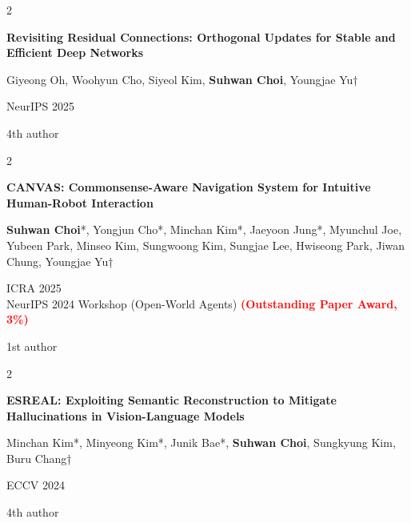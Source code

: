 \documentclass[10pt, letterpaper]{article}
\newenvironment{pubentry}[2][]{
    \onecolentry
    \def\secondColumn{#2}
    \setcolumnwidth{\fill, 2 cm}
    \begin{paracol}{2}
}{
    \switchcolumn \raggedleft \secondColumn
    \end{paracol}
    \endonecolentry
} %
\let\hrefWithoutArrow\href
\renewcommand{\href}[2]{\hrefWithoutArrow{#1}{\ifthenelse{\equal{#2}{}}{ }{#2 }\raisebox{.15ex}{\footnotesize \faExternalLink*}}}
\begin{document}
\vspace{0.2 cm}

\begin{samepage}
    \begin{pubentry}{
            4th author
        }
        \textbf{Revisiting Residual Connections: Orthogonal Updates for Stable and Efficient Deep Networks}

        \vspace{0.10 cm}

        \small Giyeong Oh, Woohyun Cho, Siyeol Kim, \textbf{Suhwan Choi}, Youngjae Yu†

        \vspace{0.10 cm}

        NeurIPS 2025
    \end{pubentry}
\end{samepage}

\vspace{0.2 cm}

\begin{samepage}
    \begin{pubentry}{
            1st author
        }
        \textbf{CANVAS: Commonsense-Aware Navigation System for Intuitive Human-Robot Interaction} \href{https://worv-ai.github.io/canvas/}{[Website]}

        \vspace{0.10 cm}

        \small \textbf{Suhwan Choi}*, Yongjun Cho*, Minchan Kim*, Jaeyoon Jung*, Myunchul Joe, Yubeen Park, Minseo Kim, Sungwoong Kim, Sungjae Lee, Hwiseong Park, Jiwan Chung, Youngjae Yu†

        \vspace{0.10 cm}

        ICRA 2025 \\
        NeurIPS 2024 Workshop (Open-World Agents) \textcolor{red}{\textbf{(Outstanding Paper Award, 3\%)}}
    \end{pubentry}
\end{samepage}

\vspace{0.2 cm}

\begin{samepage}
    \begin{pubentry}{
            4th author
        }
        \textbf{ESREAL: Exploiting Semantic Reconstruction to Mitigate Hallucinations in Vision-Language Models}

        \vspace{0.10 cm}

        \small Minchan Kim*, Minyeong Kim*, Junik Bae*, \textbf{Suhwan Choi}, Sungkyung Kim, Buru Chang†

        \vspace{0.10 cm}

        ECCV 2024
    \end{pubentry}
\end{samepage}
\end{document}

